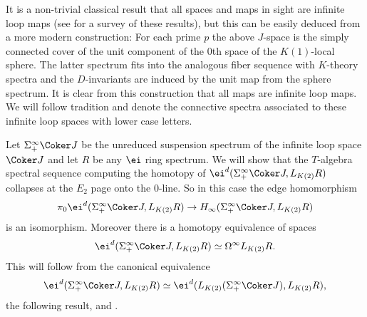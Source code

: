 \documentclass[leqno,oneside,english]{elsarticle}
\begin{document}
{{\ifshowsaveblocks
{}
\fi}}{}

It is a non-trivial classical result that all spaces and maps in sight are infinite
loop maps (see \cite{HoS78} for a survey of these results), but this can be easily deduced from a more modern construction: For each prime $p$ the above $J$-space is the simply connected cover of the unit component of the 0th space of the $K(1)$-local sphere. The latter spectrum fits into the analogous fiber sequence with $K$-theory spectra and the $D$-invariants are induced by the unit map from the sphere spectrum. It is clear from this construction that all maps are infinite loop maps. We will follow tradition and denote the connective spectra associated to these infinite loop spaces with lower case letters.

\begin{example}
  \label{ex:e-infty-maps-coker-j}
  Let $\Sigma^{\infty}_+ \Coker J$ be the unreduced suspension spectrum of the
  infinite loop space $\Coker J$ and let $R$ be any $\ei$ ring spectrum. 
  We will show that the $T$-algebra spectral sequence computing the homotopy of
  $\ei^d(\Sigma^{\infty}_+ \Coker J,L_{K(2)} R)$ collapses at the $E_2$ page onto the 0-line. So in
  this case the edge homomorphism 
  \[
  \pi_0 \ei^d(\Sigma^{\infty}_+ \Coker J,L_{K(2)}R)\rightarrow
  H_{\infty}(\Sigma^{\infty}_+ \Coker J,L_{K(2)}R)
  \] 
  is an isomorphism. Moreover there is a homotopy equivalence of spaces
  \[
  \ei^d(\Sigma^{\infty}_+ \Coker J,L_{K(2)}R)\simeq
  \Omega^{\infty}L_{K(2)}R.
  \]
  This will follow from the canonical equivalence 
   \[
  \ei^d(\Sigma^{\infty}_+ \Coker J,L_{K(2)}R)\simeq
  \ei^d(L_{K(2)}(\Sigma^{\infty}_+ \Coker J),L_{K(2)}R),
  \]
  the following result, and .
\end{example}
\end{document}
